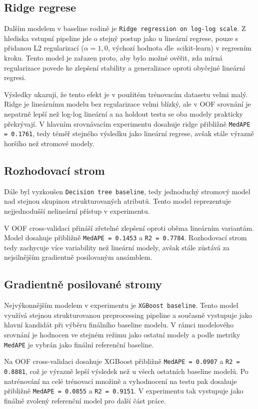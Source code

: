 \subsection*{Ridge regrese}
Dalším modelem v baseline rodině je \texttt{Ridge regression on log-log scale}. Z hlediska vstupní pipeline jde o stejný postup jako u lineární regrese, pouze s přidanou L2 regularizací (\(\alpha = 1{,}0\), výchozí hodnota dle~scikit-learn) v regresním kroku. Tento model je zařazen proto, aby bylo možné ověřit, zda mírná regularizace povede ke zlepšení stability a generalizace oproti obyčejné lineární regresi.

Výsledky ukazují, že tento efekt je v použitém trénovacím datasetu velmi malý. Ridge je lineárnímu modelu bez regularizace velmi blízký, ale v OOF srovnání je nepatrně lepší než log-log lineární a na holdout testu se oba modely prakticky překrývají. V hlavním srovnávacím experimentu dosahuje ridge přibližně \texttt{MedAPE = 0.1761}, tedy téměř stejného výsledku jako lineární regrese, avšak stále výrazně horšího než stromové modely.

\subsection*{Rozhodovací strom}
Dále byl vyzkoušen \texttt{Decision tree baseline}, tedy jednoduchý stromový model~\cite{Breiman1984CART} nad stejnou skupinou strukturovaných atributů. Tento model reprezentuje nejjednodušší nelineární přístup v experimentu.

V OOF cross-validaci přináší zřetelné zlepšení oproti oběma lineárním variantám. Model dosahuje přibližně \texttt{MedAPE = 0.1453} a \texttt{R2 = 0.7784}. Rozhodovací strom tedy zachycuje více variability než lineární modely, avšak stále zůstává za nejsilnějším gradientně posilovaným ansámblem.

\subsection*{Gradientně posilované stromy}
Nejvýkonnějším modelem v experimentu je \texttt{XGBoost baseline}. Tento model využívá stejnou strukturovanou preprocessing pipeline a současně vystupuje jako hlavní kandidát při výběru finálního baseline modelu. V rámci modelového srovnání je hodnocen ve stejném režimu jako ostatní modely a podle metriky \texttt{MedAPE} je vybrán jako finální referenční baseline.

Na OOF cross-validaci dosahuje XGBoost přibližně \texttt{MedAPE = 0.0907} a \texttt{R2 = 0.8881}, což je výrazně lepší výsledek než u všech ostatních baseline modelů. Po natrénování na celé trénovací množině a vyhodnocení na testu pak dosahuje přibližně \texttt{MedAPE = 0.0855} a \texttt{R2 = 0.9151}. V experimentu tak vystupuje jako finálně zvolený referenční model pro další část práce.

